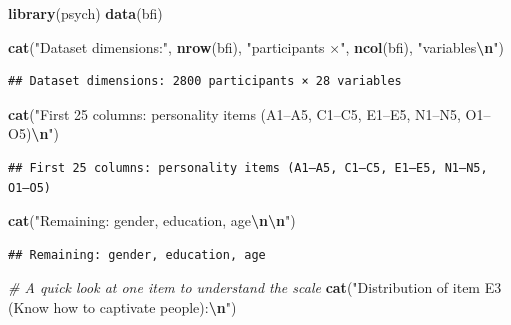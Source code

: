 \documentclass[
]{article}
\newenvironment{Shaded}{\begin{snugshade}}{\end{snugshade}}
\newcommand{\CommentTok}[1]{\textcolor[rgb]{0.56,0.35,0.01}{\textit{#1}}}
\newcommand{\FunctionTok}[1]{\textcolor[rgb]{0.13,0.29,0.53}{\textbf{#1}}}
\newcommand{\NormalTok}[1]{#1}
\newcommand{\SpecialCharTok}[1]{\textcolor[rgb]{0.81,0.36,0.00}{\textbf{#1}}}
\newcommand{\StringTok}[1]{\textcolor[rgb]{0.31,0.60,0.02}{#1}}
\begin{document}
\begin{Shaded}
\begin{Highlighting}[]
\FunctionTok{library}\NormalTok{(psych)}
\FunctionTok{data}\NormalTok{(bfi)}

\FunctionTok{cat}\NormalTok{(}\StringTok{"Dataset dimensions:"}\NormalTok{, }\FunctionTok{nrow}\NormalTok{(bfi), }\StringTok{"participants ×"}\NormalTok{, }\FunctionTok{ncol}\NormalTok{(bfi), }\StringTok{"variables}\SpecialCharTok{\textbackslash{}n}\StringTok{"}\NormalTok{)}
\end{Highlighting}
\end{Shaded}

\begin{verbatim}
## Dataset dimensions: 2800 participants × 28 variables
\end{verbatim}

\begin{Shaded}
\begin{Highlighting}[]
\FunctionTok{cat}\NormalTok{(}\StringTok{"First 25 columns: personality items (A1–A5, C1–C5, E1–E5, N1–N5, O1–O5)}\SpecialCharTok{\textbackslash{}n}\StringTok{"}\NormalTok{)}
\end{Highlighting}
\end{Shaded}

\begin{verbatim}
## First 25 columns: personality items (A1–A5, C1–C5, E1–E5, N1–N5, O1–O5)
\end{verbatim}

\begin{Shaded}
\begin{Highlighting}[]
\FunctionTok{cat}\NormalTok{(}\StringTok{"Remaining: gender, education, age}\SpecialCharTok{\textbackslash{}n\textbackslash{}n}\StringTok{"}\NormalTok{)}
\end{Highlighting}
\end{Shaded}

\begin{verbatim}
## Remaining: gender, education, age
\end{verbatim}

\begin{Shaded}
\begin{Highlighting}[]
\CommentTok{\# A quick look at one item to understand the scale}
\FunctionTok{cat}\NormalTok{(}\StringTok{"Distribution of item E3 (\textquotesingle{}Know how to captivate people\textquotesingle{}):}\SpecialCharTok{\textbackslash{}n}\StringTok{"}\NormalTok{)}
\end{Highlighting}
\end{Shaded}
\end{document}
